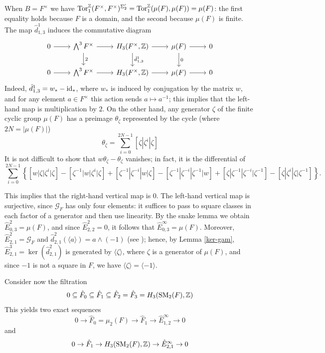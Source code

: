 \documentclass[11pt]{amsart}
\theoremstyle{definition}
\theoremstyle{plain}
\theoremstyle{definition}
\numberwithin{equation}{section}
\newcommand{\z}{\mathbb{Z}}
\newcommand{\GG}{\mathcal{G}}
\newcommand{\tors}{{{\rm Tor}_1^{\z}}}
\newcommand{\lan}{\langle}
\newcommand{\ran}{\rangle}
\newcommand{\arr}{\rightarrow}
\newcommand{\SM}{\mathit{{\rm SM}}}
\newcommand{\id}{{\rm id}}
\begin{document}
	When $B=F^\times$ we have $\tors(F^\times,F^\times)^{\Sigma'_2}=\tors(\mu(F),\mu(F))=\mu(F)$: the first equality holds because $F$ is a domain, and the second because $\mu(F)$ is finite. The map $\hat{d}^1_{1,3}$ induces the commutative diagram
	\[
	\begin{tikzcd}
		0 \ar[r] & \bigwedge^3F^\times \ar[r]\ar[d,"2"] & H_3(F^\times,\z)\ar[r]\ar[d,"\hat{d}^1_{1,3}"] & \mu(F)\ar[r]\ar[d,"0"] & 0\\
		0 \ar[r] & \bigwedge^3F^\times \ar[r] & H_3(F^\times,\z)\ar[r] & \mu(F)\ar[r] & 0
	\end{tikzcd}
	\]
	Indeed, $\hat{d}^1_{1,3}=w_*-\id_*$, where $w_*$ is induced by conjugation by the matrix $w$, and for any element $a\in F^\times$ this action sends $a\mapsto a^{-1}$; this implies that the left-hand map is multiplication by $2$. On the other hand, any generator $\zeta$ of the finite cyclic group $\mu(F)$ has a preimage $\theta_{\zeta}$ represented by the cycle (where $2N=|\mu(F)|$)
	\[
	\theta_{\zeta}=\sum^{2N-1}_{i=0}[\zeta|\zeta^i|\zeta]
	\]
	It is not difficult to show that $w\theta_{\zeta}-\theta_{\zeta}$ vanishes; in fact, it is the differential of
	\[
	\sum^{2N-1}_{i=0}\left\{[w|\zeta|\zeta^i|\zeta]-[\zeta^{-1}|w|\zeta^i|\zeta]+[\zeta^{-1}|\zeta^{-i}|w|\zeta]-[\zeta^{-1}|\zeta^{-i}|\zeta^{-1}|w]+[\zeta|\zeta^{-1}|\zeta^{-i}|\zeta^{-1}]-[\zeta|\zeta^i|\zeta|\zeta^{-1}]\right\}.
	\]
	
	This implies that the right-hand vertical map is $0$. The left-hand vertical map is surjective, since $\GG_F$ has only four elements: it suffices to pass to square classes in each factor of a generator and then use linearity. By the snake lemma we obtain $\hat{E}^2_{0,3}=\mu(F)$, and since $\hat{E}^2_{2,2}=0$, it follows that $\hat{E}^{\infty}_{0,3}=\mu(F)$. Moreover, $\hat{E}^2_{2,1}=\GG_F$ and $\hat{d}^2_{2,1}(\lan a\ran)=a\wedge(-1)$ (see \cite[\S 5]{B-E--2023}); hence, by Lemma \ref{ker-gam}, $\hat{E}^3_{2,1}=\ker(\hat{d}^2_{2,1})$ is generated by $\lan\zeta\ran$, where $\zeta$ is a generator of $\mu(F)$, and since $-1$ is not a square in $F$, we have $\lan\zeta\ran=\lan-1\ran$. 
	
	Consider now the filtration
	\[
	0\subseteq \hat{F}_0\subseteq \hat{F}_1\subseteq \hat{F}_2= \hat{F}_3=H_3(\SM_2(F),\z)
	\]
	This yields two exact sequences
	\begin{equation}
		\label{sq-sm2-1}
		0 \arr \hat{F}_0=\mu_2(F)\arr \hat{F}_1\arr \hat{E}^{\infty}_{1,2}\arr 0
	\end{equation}
	and
	\begin{equation}
		\label{sq-sm2-2}
		0 \arr \hat{F}_1\arr H_3(\SM_2(F),\z)\arr \hat{E}^{\infty}_{2,1}\arr 0
	\end{equation}
	
\end{document}
